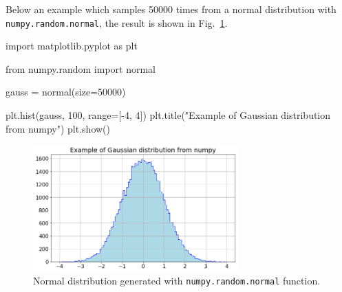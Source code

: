 Below an example which samples 50000 times from a normal distribution  with \texttt{numpy.random.normal}, the result is shown in Fig.~\ref{fig:gauss_dist}.

\begin{ipython}
import matplotlib.pyplot as plt

from numpy.random import normal

gauss = normal(size=50000)

plt.hist(gauss, 100, range=[-4, 4])
plt.title("Example of Gaussian distribution from numpy")
plt.show()
\end{ipython}

\begin{figure}
\centering
\includegraphics[width=0.7\textwidth]{figures/standard_normal}
\caption{Normal distribution generated with \texttt{numpy.random.normal} function.}
\label{fig:gauss_dist}
\end{figure}

